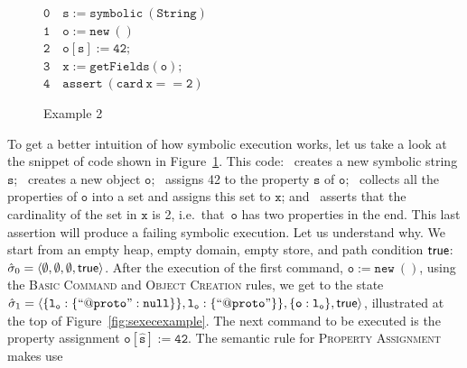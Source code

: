 \vspace{5pt}
\begin{figure}
{\small
\hspace*{0.25cm} $\mathtt{0\quad s := symbolic\ (String)}$ \\
\hspace*{0.25cm} $\mathtt{1\quad o := new\ ()}$ \\
\hspace*{0.25cm} $\mathtt{2\quad o[s] := 42};$ \\
\hspace*{0.25cm} $\mathtt{3\quad x := getFields(o);}$ \\
\hspace*{0.25cm} $\mathtt{4\quad assert\ (card \ x == 2)}$
}
\caption{\jsil Example 2\label{jsil:example:symbolic}}
\end{figure}
To get a better intuition of how symbolic execution works, let us take a look at the snippet of code shown in Figure~\ref{jsil:example:symbolic}. 
This code: 
        ~creates a new symbolic string $\mathtt{s}$;
	~creates a new object $\mathtt{o}$;
	~assigns 42 to the property $\mathtt{s}$ of $\mathtt{o}$; 
	~collects all the properties of $\mathtt{o}$ into a set and assigns this set to $\mathtt{x}$; and
	~asserts that the cardinality of the set in $\mathtt{x}$ is 2, i.e.~that~$\mathtt{o}$ has two properties in the end. 
	     This last assertion will produce a failing symbolic execution. Let us understand why.
%
We start from an empty heap, empty domain, empty store, and path condition ${\sf true}$: 
$\hat{\sigma}_0 = \langle \emptyset, \emptyset, \emptyset, {\sf true} \rangle$. After the execution of the first command, $\mathtt{o := new\ ()}$, using the \textsc{Basic Command} and \textsc{Object Creation} rules, we get to the state {\small $\hat{\sigma}_1 = \langle \{ \mathtt{l_o : \{ ``@proto" : null} \} \}, \mathtt{l_o : \{ ``@proto"} \} \}, \{ \mathtt{o : l_o} \} , {\sf true} \rangle$}, illustrated at the top of Figure~\ref{fig:sexecexample}.
The next command to be executed is the property assignment $\mathtt{o[\hat{s}] := 42}$. The semantic rule for \textsc{Property Assignment} makes use 
